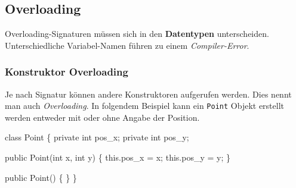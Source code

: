 \documentclass[
  9pt,
  a4paperpaper,
  DIV=11]{scrartcl}
\newenvironment{Shaded}{}{}
\newcommand{\DataTypeTok}[1]{\textcolor[rgb]{0.84,0.23,0.29}{#1}}
\newcommand{\FunctionTok}[1]{\textcolor[rgb]{0.44,0.26,0.76}{#1}}
\newcommand{\KeywordTok}[1]{\textcolor[rgb]{0.84,0.23,0.29}{#1}}
\newcommand{\NormalTok}[1]{\textcolor[rgb]{0.14,0.16,0.18}{#1}}
\newcommand{\OperatorTok}[1]{\textcolor[rgb]{0.14,0.16,0.18}{#1}}
\numberwithin{equation}{section}
\begin{document}
\begin{multicols}{2}
\hypertarget{overloading}{%
\subsection{Overloading}\label{overloading}}

\begin{tcolorbox}[enhanced jigsaw, colbacktitle=quarto-callout-important-color!10!white, colback=white, rightrule=.15mm, title=\textcolor{quarto-callout-important-color}{\faExclamation}\hspace{0.5em}{Wichtig}, opacityback=0, arc=.35mm, coltitle=black, opacitybacktitle=0.6, breakable, bottomtitle=1mm, toptitle=1mm, colframe=quarto-callout-important-color-frame, bottomrule=.15mm, titlerule=0mm, left=2mm, leftrule=.75mm, toprule=.15mm]

Overloading-Signaturen müssen sich in den \textbf{Datentypen}
unterscheiden. Unterschiedliche Variabel-Namen führen zu einem
\emph{Compiler-Error}.

\end{tcolorbox}

\hypertarget{konstruktor-overloading}{%
\subsubsection{Konstruktor Overloading}\label{konstruktor-overloading}}

Je nach Signatur können andere Konstruktoren aufgerufen werden. Dies
nennt man auch \emph{Overloading}. In folgendem Beispiel kann ein
\texttt{Point} Objekt erstellt werden entweder mit oder ohne Angabe der
Position.

\begin{Shaded}
\begin{Highlighting}[]
\KeywordTok{class}\NormalTok{ Point }\OperatorTok{\{}
  \KeywordTok{private} \DataTypeTok{int}\NormalTok{ pos\_x}\OperatorTok{;}
  \KeywordTok{private} \DataTypeTok{int}\NormalTok{ pos\_y}\OperatorTok{;}

  \KeywordTok{public} \FunctionTok{Point}\OperatorTok{(}\DataTypeTok{int}\NormalTok{ x}\OperatorTok{,} \DataTypeTok{int}\NormalTok{ y}\OperatorTok{)} \OperatorTok{\{}
    \KeywordTok{this}\OperatorTok{.}\FunctionTok{pos\_x} \OperatorTok{=}\NormalTok{ x}\OperatorTok{;}
    \KeywordTok{this}\OperatorTok{.}\FunctionTok{pos\_y} \OperatorTok{=}\NormalTok{ y}\OperatorTok{;}
  \OperatorTok{\}}

  \KeywordTok{public} \FunctionTok{Point}\OperatorTok{()} \OperatorTok{\{} \OperatorTok{\}}
\OperatorTok{\}}
\end{Highlighting}
\end{Shaded}


\end{multicols}
\end{document}
